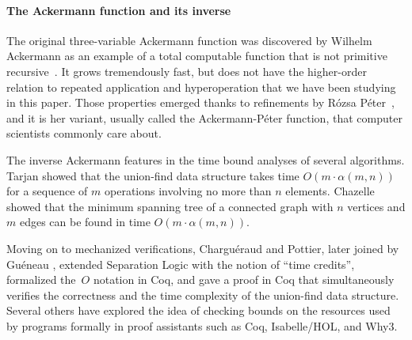 \paragraph*{The Ackermann function and its inverse}
The original three-variable Ackermann function was discovered by
Wilhelm Ackermann as an example of a total computable function that
is not primitive recursive~\cite{ackermann}.
It grows tremendously fast, but does not have the higher-order
relation to repeated application and hyperoperation that we have been studying in
this paper. Those properties emerged thanks to refinements by Rózsa Péter~\cite{peter},
and it is her variant, usually called the Ackermann-Péter function, 
that computer scientists commonly care about.

The inverse Ackermann
features in the time bound analyses of several algorithms.
Tarjan \cite{tarjan} showed that the union-find data structure
takes time $O(m\cdot\alpha(m,n))$ for a sequence of $m$ operations
involving no more than $n$ elements. 
Chazelle \cite{chazelle} showed that the minimum spanning tree
of a connected graph with $n$ vertices and $m$ edges
can be found in time $O(m\cdot\alpha(m,n))$.

Moving on to mechanized verifications, Charguéraud and Pottier, 
later joined by Guéneau \cite{charpott,gueneauetal},
extended Separation Logic with the notion of ``time credits'',
formalized the~$O$ notation in Coq,
and gave a proof in Coq that simultaneously verifies the correctness
and the time complexity of the union-find data structure. Several others
\cite{others2,others4,others3,others1}
have explored the idea of checking bounds on the resources
used by programs formally in proof assistants such as Coq, Isabelle/HOL, and Why3.

